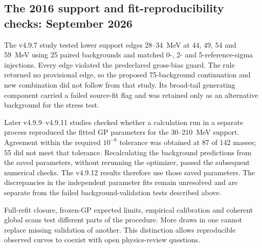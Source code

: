 \subsection{The 2016 support and fit-reproducibility checks: September 2026}
The v4.9.7 study tested lower support edges 28--34~MeV at 44, 49, 54 and
59~MeV using 25 paired backgrounds and matched 0-, 2- and 5-reference-sigma
injections. Every edge violated the predeclared gross-bias guard. The rule
returned no provisional edge, so the proposed 75-background continuation and
new combination did not follow from that study. Its broad-tail generating
component carried a failed source-fit flag and was retained only as an
alternative background for the stress test.

Later v4.9.9--v4.9.11 studies checked whether a calculation run in a
separate process reproduced the fitted GP parameters for the 30--210~MeV
support. Agreement within the required $10^{-6}$ tolerance was obtained at
87 of 142 masses; 55 did not meet that tolerance. Recalculating the
background predictions from the saved parameters, without rerunning the
optimizer, passed the subsequent numerical checks. The v4.9.12 results
therefore use those saved parameters. The discrepancies in the independent
parameter fits remain unresolved and are separate from the failed
background-validation tests described above.

Full-refit closure, frozen-GP expected limits, empirical \CLs{} calibration
and coherent global scans test different parts of the procedure. More draws
in one cannot replace missing validation of another. This distinction allows
reproducible observed curves to coexist with open physics-review questions.
